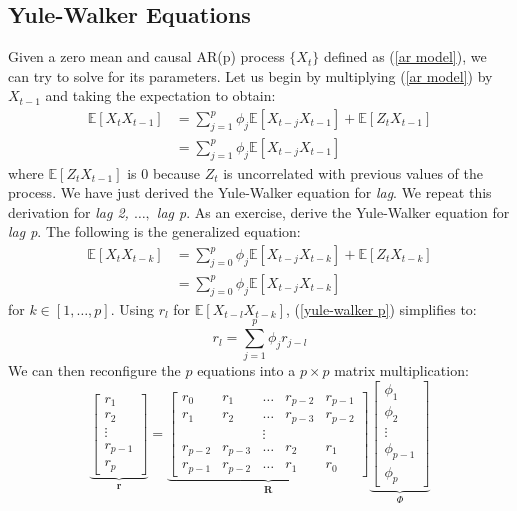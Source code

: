 \documentclass{article}
\begin{document}
\subsection{Yule-Walker Equations}
Given a zero mean and causal AR(p) process $\{X_t\}$ defined as (\ref{ar model}), we can try to solve for its parameters. Let us begin by multiplying (\ref{ar model}) by $X_{t-1}$ and taking the expectation to obtain:
\begin{align}\label{yule-walker 1}
    \mathbb{E}[X_t X_{t-1}] &= \sum_{j=1}^p \phi_j \mathbb{E} [X_{t-j} X_{t-1}] + \mathbb{E}[Z_t X_{t-1}] \nonumber\\
    &= \sum_{j=1}^p \phi_j \mathbb{E} [X_{t-j} X_{t-1}]
\end{align}
where $\mathbb{E}[Z_t X_{t-1}]$ is $0$ because $Z_t$ is uncorrelated with previous values of the process. We have just derived the Yule-Walker equation for \emph{lag}. We repeat this derivation for \emph{lag 2, $\ldots,$ lag p}. As an exercise, derive the Yule-Walker equation for \emph{lag p}. The following is the generalized equation:
\begin{align}\label{yule-walker p}
    \mathbb{E}[X_t X_{t-k}] &= \sum_{j=0}^p \phi_j \mathbb{E} [X_{t-j} X_{t-k}] + \mathbb{E}[Z_t X_{t-k}] \nonumber\\
    &= \sum_{j=0}^p \phi_j \mathbb{E} [X_{t-j} X_{t-k}]
\end{align}
for $k \in [1,\ldots, p]$. Using $r_l$ for $\mathbb{E}[X_{t-l} X_{t-k}]$, (\ref{yule-walker p}) simplifies to:
\begin{equation}\label{yule walker simplified}
    r_l = \sum_{j=1}^p \phi_j r_{j-l}
\end{equation}
We can then reconfigure the $p$ equations into a $p\times p$ matrix multiplication:
\begin{equation}
    \underbrace{\begin{bmatrix}
        r_1\\
        r_2\\
        \vdots\\
        r_{p-1}\\
        r_p
    \end{bmatrix}}_{\textbf{r}}
    =
    \underbrace{\begin{bmatrix}
        r_0 & r_1 &\ldots & r_{p-2} & r_{p-1}\\
        r_1 & r_2 &\ldots & r_{p-3} & r_{p-2}\\
        &  & \vdots & &\\
        r_{p-2} & r_{p-3} & \ldots & r_2 & r_1\\
        r_{p-1} & r_{p-2} & \ldots & r_1 & r_0
    \end{bmatrix}}_{\textbf{R}}
    \underbrace{\begin{bmatrix}
        \phi_1 \\
        \phi_2 \\
        \vdots\\
        \phi_{p-1}\\
        \phi_p
    \end{bmatrix}}_{\textbf{$\Phi$}}\nonumber
\end{equation}
\end{document}
